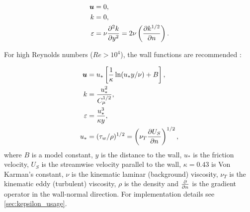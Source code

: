 \begin{align}
\bmu &= 0, \label{ubc1}\\
k &= 0, \label{kbc1}\\
\epsilon &= \nu \ppxx[y]{k} = 2 \nu \left ( \ppx[n]{k^{1/2}} \right ). \label{epsbc1}
\end{align}

For high Reynolds numbers ($Re>10^4$), the  wall functions are recommended \citep{wilcox1998turbulence}:

\begin{align}
\bmu &= u_* \left [ \frac{1}{\kappa} \ln (u_* y / \nu) + B \right ], \label{ubc2}\\
k &= \frac{u_*^2}{C_{\mu}^{1/2}}, \label{kbc2}\\
\epsilon &= \frac{u_*^3}{\kappa y}, \label{epsbc2}\\
u_* &= (\tau_w / \rho)^{1/2} = \left ( \nu_T \ppx[n]{U_S} \right )^{1/2}, \label{ustar}
\end{align}
where $B$ is a model constant, $y$ is the distance to the wall, $u_*$ is the friction velocity, $U_S$ is the streamwise velocity parallel to the wall, $\kappa=0.43$ is Von Karman's constant, $\nu$ is the kinematic laminar (background) viscosity, $\nu_T$ is the kinematic eddy (turbulent) viscosity, $\rho$ is the density and $\ppx[n]{}$ is the gradient operator in the wall-normal direction. For implementation details see \ref{sec:kepsilon_usage}.

